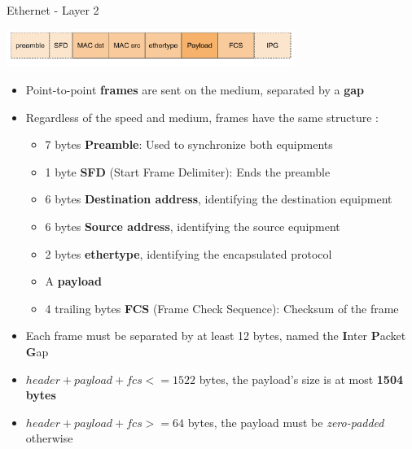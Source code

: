 \begin{frame}{Ethernet - Layer 2}
	\begin{center}
	\includegraphics[width=0.7\textwidth]{slides/networking-stack-overview/ethernet_frame.pdf}
	\end{center}
	\begin{itemize}
		\item Point-to-point \textbf{frames} are sent on the medium, separated by a \textbf{gap}
		\item Regardless of the speed and medium, frames have the same structure :
			\begin{itemize}
				\item 7 bytes \textbf{Preamble}: Used to synchronize both equipments
				\item 1 byte \textbf{SFD} (Start Frame Delimiter): Ends the preamble
				\item 6 bytes \textbf{Destination address}, identifying the destination equipment
				\item 6 bytes \textbf{Source address}, identifying the source equipment
				\item 2 bytes \textbf{ethertype}, identifying the encapsulated protocol
				\item A \textbf{payload}
				\item 4 trailing bytes \textbf{FCS} (Frame Check Sequence): Checksum of the frame
			\end{itemize}
		\item Each frame must be separated by at least 12 bytes, named the \textbf{I}nter \textbf{P}acket \textbf{G}ap
		\item $header + payload + fcs <= 1522$ bytes, the payload's size is at most \textbf{1504 bytes}
		\item $header + payload + fcs >= 64$ bytes, the payload must be \textit{zero-padded} otherwise
	\end{itemize}
\end{frame}


